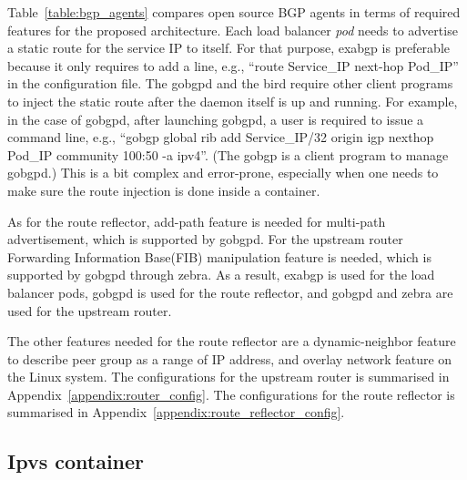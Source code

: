 Table~\ref{table:bgp_agents} compares open source BGP agents in terms of required features for the proposed architecture.
Each load balancer {\em pod} needs to advertise a static route for the service IP to itself. 
For that purpose, exabgp is preferable because it only requires to add a line, e.g., \enquote{route Service\_IP next-hop Pod\_IP} in the configuration file.
The gobgpd and the bird require other client programs to inject the static route after the daemon itself is up and running.
For example, in the case of gobgpd, after launching gobgpd, a user is required to issue a command line, e.g., \enquote{gobgp global rib add Service\_IP/32 origin igp nexthop Pod\_IP community 100:50 -a ipv4}.
(The gobgp is a client program to manage gobgpd.)
This is a bit complex and error-prone, especially when one needs to make sure the route injection is done inside a container.

As for the route reflector, add-path\cite{rfc7911} feature is needed for multi-path advertisement, which is supported by gobgpd.
For the upstream router Forwarding Information Base(FIB) manipulation\cite{exa-networks_2018} feature is needed, which is supported by gobgpd through zebra\cite{osrg_gobgp_zebra}.
As a result, exabgp is used for the load balancer pods, gobgpd is used for the route reflector, and gobgpd and zebra are used for the upstream router.

The other features needed for the route reflector are a dynamic-neighbor feature to describe peer group as a range of IP address, and overlay network feature on the Linux system.
The configurations for the upstream router is summarised in Appendix~\ref{appendix:router_config}.
The configurations for the route reflector is summarised in Appendix~\ref{appendix:route_reflector_config}.

\subsection{Ipvs container}\label{sec:ipvs}

